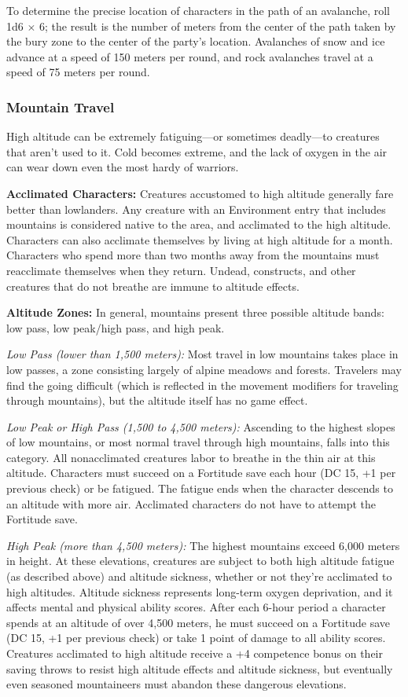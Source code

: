 To determine the precise location of characters in the path of an avalanche, roll 1d6 $\times$ 6; the result is the number of meters from the center of the path taken by the bury zone to the center of the party's location. Avalanches of snow and ice advance at a speed of 150 meters per round, and rock avalanches travel at a speed of 75 meters per round.

\subsubsection{Mountain Travel}
High altitude can be extremely fatiguing---or sometimes deadly---to creatures that aren't used to it. Cold becomes extreme, and the lack of oxygen in the air can wear down even the most hardy of warriors.

\textbf{Acclimated Characters:} Creatures accustomed to high altitude generally fare better than lowlanders. Any creature with an Environment entry that includes mountains is considered native to the area, and acclimated to the high altitude. Characters can also acclimate themselves by living at high altitude for a month. Characters who spend more than two months away from the mountains must reacclimate themselves when they return. Undead, constructs, and other creatures that do not breathe are immune to altitude effects.

\textbf{Altitude Zones:} In general, mountains present three possible altitude bands: low pass, low peak/high pass, and high peak.

\textit{Low Pass (lower than 1,500 meters):} Most travel in low mountains takes place in low passes, a zone consisting largely of alpine meadows and forests. Travelers may find the going difficult (which is reflected in the movement modifiers for traveling through mountains), but the altitude itself has no game effect.

\textit{Low Peak or High Pass (1,500 to 4,500 meters):} Ascending to the highest slopes of low mountains, or most normal travel through high mountains, falls into this category. All nonacclimated creatures labor to breathe in the thin air at this altitude. Characters must succeed on a Fortitude save each hour (DC 15, +1 per previous check) or be fatigued. The fatigue ends when the character descends to an altitude with more air. Acclimated characters do not have to attempt the Fortitude save.

\textit{High Peak (more than 4,500 meters):} The highest mountains exceed 6,000 meters in height. At these elevations, creatures are subject to both high altitude fatigue (as described above) and altitude sickness, whether or not they're acclimated to high altitudes. Altitude sickness represents long-term oxygen deprivation, and it affects mental and physical ability scores. After each 6-hour period a character spends at an altitude of over 4,500 meters, he must succeed on a Fortitude save (DC 15, +1 per previous check) or take 1 point of damage to all ability scores. Creatures acclimated to high altitude receive a +4 competence bonus on their saving throws to resist high altitude effects and altitude sickness, but eventually even seasoned mountaineers must abandon these dangerous elevations.